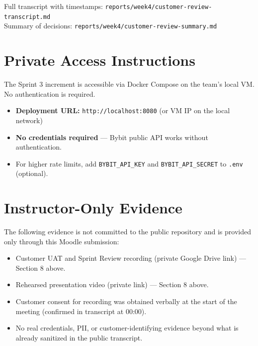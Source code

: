 \documentclass[11pt,a4paper]{article}
\begin{document}
Full transcript with timestamps: \texttt{reports/week4/customer-review-transcript.md} \\
Summary of decisions: \texttt{reports/week4/customer-review-summary.md}

\section{Private Access Instructions}

The Sprint 3 increment is accessible via Docker Compose on the team's local VM. No authentication is required.

\begin{itemize}
    \item \textbf{Deployment URL:} \texttt{http://localhost:8080} (or VM IP on the local network)
    \item \textbf{No credentials required} --- Bybit public API works without authentication.
    \item For higher rate limits, add \texttt{BYBIT\_API\_KEY} and \texttt{BYBIT\_API\_SECRET} to \texttt{.env} (optional).
\end{itemize}

\section{Instructor-Only Evidence}

The following evidence is not committed to the public repository and is provided only through this Moodle submission:

\begin{itemize}
    \item Customer UAT and Sprint Review recording (private Google Drive link) --- Section 8 above.
    \item Rehearsed presentation video (private link) --- Section 8 above.
    \item Customer consent for recording was obtained verbally at the start of the meeting (confirmed in transcript at 00:00).
    \item No real credentials, PII, or customer-identifying evidence beyond what is already sanitized in the public transcript.
\end{itemize}
\end{document}
